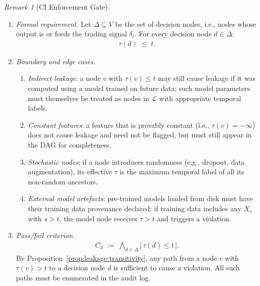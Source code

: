 \documentclass[12pt,openany]{book}
\numberwithin{equation}{chapter}
\theoremstyle{plain}
\theoremstyle{definition}
\theoremstyle{remark}
\newtheorem{remark}[theorem]{Remark}
\numberwithin{equation}{chapter}
\theoremstyle{plain}
\begin{document}
\begin{remark}[CI Enforcement Gate]
\begin{enumerate}
\begin{enumerate}
    \item \emph{Formal requirement.}
          Let $\Delta \subseteq V$ be the set of decision
          nodes, i.e., nodes whose output is or feeds the
          trading signal $\delta_{t}$.  For every decision
          node $d \in \Delta$:
          \begin{align}
            \tau(d) \;\leq\; t.
            \label{eq:ci-dag}
          \end{align}

    \item \emph{Boundary and edge cases.}
    \begin{enumerate}
      \item \emph{Indirect leakage}: a node $v$ with
            $\tau(v) \leq t$ may still cause leakage if it
            was computed using a model trained on future
            data; such model parameters must themselves be
            treated as nodes in $\mathcal{L}$ with
            appropriate temporal labels.
      \item \emph{Constant features}: a feature that is
            provably constant (i.e., $\tau(v) = -\infty$)
            does not cause leakage and need not be flagged,
            but must still appear in the DAG for
            completeness.
      \item \emph{Stochastic nodes}: if a node introduces
            randomness (e.g., dropout, data augmentation),
            its effective $\tau$ is the maximum temporal
            label of all its non-random ancestors.
      \item \emph{External model artefacts}: pre-trained
            models loaded from disk must have their training
            data provenance declared; if training data
            includes any $X_{s}$ with $s > t$, the model
            node receives $\tau > t$ and triggers a
            violation.
    \end{enumerate}

    \item \emph{Pass/fail criterion.}
          \begin{align}
            C_{3} \;:=\;
            \bigwedge_{d \in \Delta}
            \bigl[\,\tau(d) \leq t\,\bigr].
            \label{eq:c3-def}
          \end{align}
          By Proposition~\ref{prop:leakage-transitivity},
          any path from a node $v$ with $\tau(v) > t$ to a
          decision node $d$ is sufficient to cause a
          violation.  All such paths must be enumerated in
          the audit log.


\end{enumerate}
\end{enumerate}
\end{remark}
\end{document}
